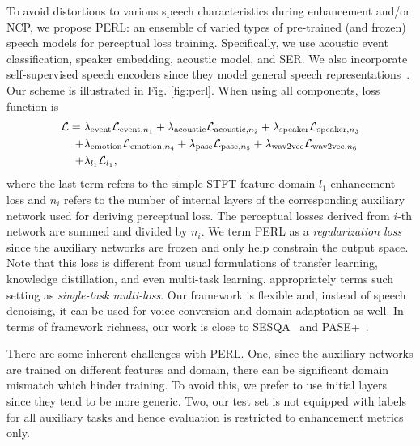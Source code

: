 \documentclass{article}
\begin{document}
To avoid distortions to various speech characteristics during enhancement and/or \ac{NCP}, we propose \ac{PERL}: an ensemble of varied types of pre-trained (and frozen) speech models for perceptual loss training.
Specifically, we use acoustic event classification, speaker embedding, acoustic model, and \ac{SER}.
We also incorporate self-supervised speech encoders since they model general speech representations~\cite{baevski2020wav2vec}.
Our scheme is illustrated in Fig. \ref{fig:perl}.
When using all components, loss function is
\begin{equation}
\begin{aligned}
    \mathcal{L} = \hspace{1mm}&\lambda_{\text{event}}\mathcal{L}_{\text{event},n_1} + \lambda_{\text{acoustic}}\mathcal{L}_{\text{acoustic},n_2} + \lambda_{\text{speaker}}\mathcal{L}_{\text{speaker},n_3}\\ +& \lambda_{\text{emotion}}\mathcal{L}_{\text{emotion},n_4} + \lambda_{\text{pase}}\mathcal{L}_{\text{pase},n_5} + \lambda_{\text{wav2vec}}\mathcal{L}_{\text{wav2vec},n_6}\\
    +&\lambda_{l_1}\mathcal{L}_{l_1},
\end{aligned}
\end{equation}
where the last term refers to the simple \ac{STFT} feature-domain $l_1$ enhancement loss and $n_i$ refers to the number of internal layers of the corresponding auxiliary network used for deriving perceptual loss.
The perceptual losses derived from $i$-th network are summed and divided by $n_i$.
We term \ac{PERL} as a \emph{regularization loss} since the auxiliary networks are frozen and only help constrain the output space.
Note that this loss is different from usual formulations of transfer learning, knowledge distillation, and even multi-task learning.
\cite{groenendijk2020multi} appropriately terms such setting as \emph{single-task multi-loss}.
Our framework is flexible and, instead of speech denoising, it can be used for voice conversion and domain adaptation as well.
In terms of framework richness, our work is close to \ac{SESQA}~\cite{serra2020sesqa} and PASE+~\cite{ravanelli2020multi}.

There are some inherent challenges with \ac{PERL}.
One, since the auxiliary networks are trained on different features and domain, there can be significant domain mismatch which hinder training.
To avoid this, we prefer to use initial layers since they tend to be more generic.
Two, our test set is not equipped with labels for all auxiliary tasks and hence evaluation is restricted to enhancement metrics only.
\end{document}
